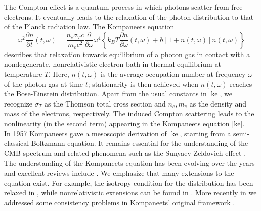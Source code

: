 \documentclass[a4paper,12pt,reqno,superscriptaddress,nofootinbib]{revtex4}
\newcommand{\0}{^{(0)}}
\newcommand{\1}{^{(1)}}
\newcommand{\2}{^{(2)}}
\begin{document}
The Compton effect is a quantum process in which photons scatter from free electrons.  It  eventually  leads to the relaxation of the photon distribution to that of the Planck radiation law.
The Kompaneets equation 
\begin{equation}\label{ke}
	\omega^2\frac{\partial n}{\partial t}(t,\omega)= \frac{n_e\sigma_T 
		c}{m_e c^2}\frac{\partial }{\partial \omega}\omega^4\left\{k_B T 
	\frac{\partial n}{\partial \omega}(t,\omega) + 
	\hbar\left[1+n(t,\omega)\right]n(t,\omega)\right\}
\end{equation}
 describes that relaxation towards equilibrium of a photon gas in contact with a nondegenerate, nonrelativistic electron bath in thermal equilibrium at temperature $T$. Here, $n(t,\omega)$ is the average occupation number  at frequency $\omega$ of the photon gas at time $t$; stationarity is then achieved when $n(t,\omega)$ reaches the Bose-Einstein distribution. Apart from the usual constants in \eqref{ke}, we recognize $\sigma_T$ as the Thomson total cross section and $n_e,m_e$ as the density and mass of the electrons, respectively.  The induced Compton scattering \cite{liedahl, blandford}  leads to the nonlinearity (in the second term) appearing in the Kompaneets equation \eqref{ke}.\\
 In 1957 Kompaneets \cite{kompa} gave a mesoscopic derivation of \eqref{ke}, starting from a semi-classical Boltzmann equation. It remains essential for the understanding of the CMB spectrum and related phenomena such as the Sunyaev-Zeldovich effect \cite{sunyaeveffect,sunyaev}.  The understanding of the Kompaneets equation has been evolving over the years and excellent reviews include \cite{practical,gui,zeldovich}. We emphasize that many extensions to the equation exist.  For example, the isotropy condition for the distribution  has been relaxed in \cite{buet, pitrou}, while nonrelativistic extensions can be found in \cite{barbosa, brown, itoh, itoh2, cooper, kohyama1, kohyama2, kohyama3}.  More recently in \cite{paper} we addressed some consistency problems in Kompaneets' original framework \cite{kompa}.\\
\end{document}
